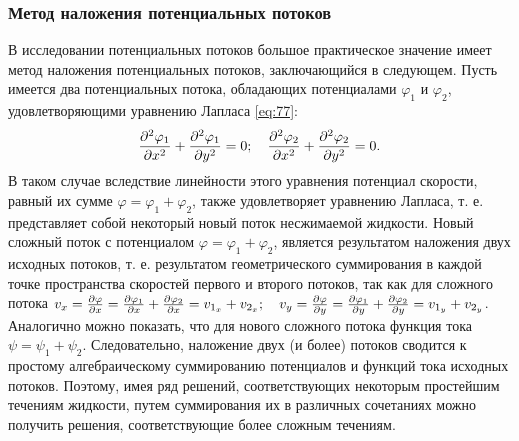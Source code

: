 	\subsubsection{Метод наложения потенциальных потоков}
	В исследовании потенциальных потоков большое практическое значение имеет метод наложения потенциальных потоков, заключающийся в следующем. Пусть имеется два потенциальных потока, обладающих потенциалами $\varphi_1$ и $\varphi_2$, удовлетворяющими уравнению Лапласа \eqref{eq:77}:
	\begin{gather*}
		\frac{\partial^2\varphi_1}{\partial x^2} + \frac{\partial^2\varphi_1}{\partial y^2} = 0; \quad \frac{\partial^2\varphi_2}{\partial x^2} + \frac{\partial^2\varphi_2}{\partial y^2} = 0.
	\end{gather*}\n
	В таком случае вследствие линейности этого уравнения потенциал скорости, равный их сумме $\varphi = \varphi_1 + \varphi_2$, также удовлетворяет уравнению Лапласа, т. е. представляет собой некоторый новый поток несжимаемой жидкости.\n
	Новый сложный поток с потенциалом $\varphi = \varphi_1 + \varphi_2$, является результатом наложения двух исходных потоков, т. е. результатом геометрического суммирования в каждой точке пространства скоростей первого и второго потоков, так как для сложного потока $v_x = \frac{\partial\varphi}{\partial x} = \frac{\partial\varphi_1}{\partial x} + \frac{\partial\varphi_2}{\partial x} = v_{1_x} + v_{2_x}; \quad v_y = \frac{\partial\varphi}{\partial y} = \frac{\partial\varphi_1}{\partial y} + \frac{\partial\varphi_2}{\partial y} = v_{1_y} + v_{2_y}$.\n
	Аналогично можно показать, что для нового сложного потока функция тока $\psi = \psi_1 + \psi_2$.\n
	Следовательно, наложение двух (и более) потоков сводится к простому алгебраическому суммированию потенциалов и функций тока исходных потоков. Поэтому, имея ряд решений, соответствующих некоторым простейшим течениям жидкости, путем суммирования их в различных сочетаниях можно получить решения, соответствующие более сложным течениям.
	
